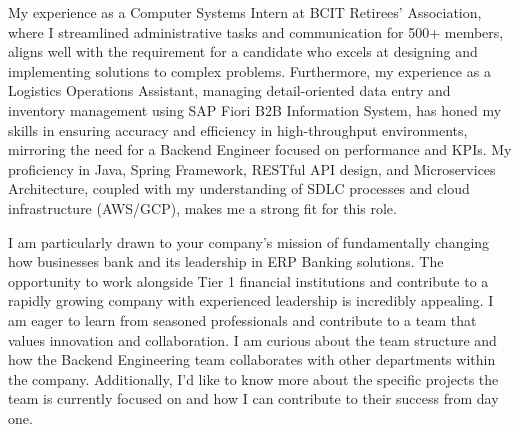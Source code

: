 \documentclass[letterpaper,11pt]{article}
\begin{document}
My experience as a Computer Systems Intern at BCIT Retirees’ Association, where I streamlined administrative tasks and communication for 500+ members, aligns well with the requirement for a candidate who excels at designing and implementing solutions to complex problems. Furthermore, my experience as a Logistics Operations Assistant, managing detail-oriented data entry and inventory management using SAP Fiori B2B Information System, has honed my skills in ensuring accuracy and efficiency in high-throughput environments, mirroring the need for a Backend Engineer focused on performance and KPIs. My proficiency in Java, Spring Framework, RESTful API design, and Microservices Architecture, coupled with my understanding of SDLC processes and cloud infrastructure (AWS/GCP), makes me a strong fit for this role.
\vspace{10pt}

I am particularly drawn to your company's mission of fundamentally changing how businesses bank and its leadership in ERP Banking solutions. The opportunity to work alongside Tier 1 financial institutions and contribute to a rapidly growing company with experienced leadership is incredibly appealing. I am eager to learn from seasoned professionals and contribute to a team that values innovation and collaboration. I am curious about the team structure and how the Backend Engineering team collaborates with other departments within the company. Additionally, I'd like to know more about the specific projects the team is currently focused on and how I can contribute to their success from day one.
\vspace{10pt}
\end{document}
